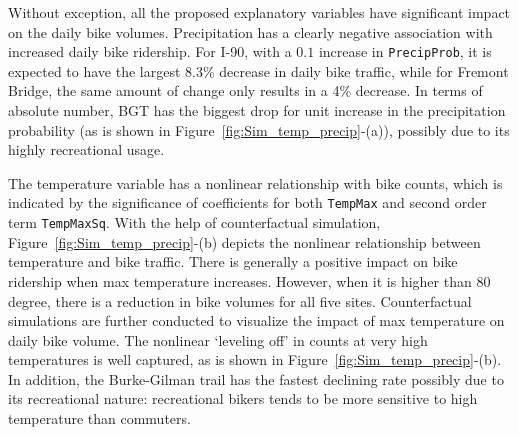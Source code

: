 \documentclass [11pt, proquest] {uwthesis}[2015/03/03]
\begin{document}
Without exception, all the proposed explanatory variables have significant impact on the daily bike volumes. Precipitation has a clearly negative association with increased daily bike ridership. For I-90, with a $0.1$ increase in \texttt{PrecipProb}, it is expected to have the largest 8.3\% decrease in daily bike traffic, while for Fremont Bridge, the same amount of change only results in a 4\% decrease. In terms of absolute number, BGT has the biggest drop for unit increase in the precipitation probability (as is shown in Figure~\ref{fig:Sim_temp_precip}-(a)), possibly due to its highly recreational usage. %


The temperature variable has a nonlinear relationship with bike counts, which is indicated by the significance of coefficients for both \texttt{TempMax} and second order term \texttt{TempMaxSq}. With the help of counterfactual simulation, Figure~\ref{fig:Sim_temp_precip}-(b) depicts the nonlinear relationship between temperature and bike traffic. There is generally a positive impact on bike ridership when max temperature increases. However, when it is higher than 80 degree, there is a reduction in bike volumes for all five sites. Counterfactual simulations are further conducted to visualize the impact of max temperature on daily bike volume. The nonlinear `leveling off' in counts at very high temperatures is well captured, as is shown in Figure~\ref{fig:Sim_temp_precip}-(b). In addition, the Burke-Gilman trail has the fastest declining rate possibly due to its recreational nature: recreational  bikers tends to be more sensitive to high temperature than commuters. 
\end{document}
